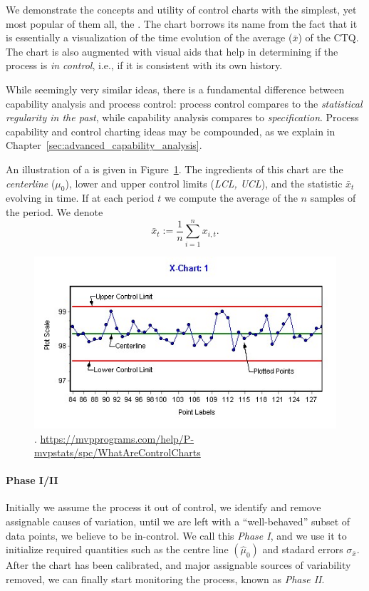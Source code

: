 We demonstrate the concepts and utility of control charts with the simplest, yet most popular of them all, the \barxChart. 
The chart borrows its name from the fact that it is essentially a visualization of the time evolution of the average ($\bar{x}$) of the CTQ. 
The chart is also augmented with visual aids that help in determining if the process is \emph{in control}, i.e., if it is consistent with its own history. 

\begin{remark}
While seemingly very similar ideas, there is a fundamental difference between capability analysis and process control:  process control compares to the \emph{statistical regularity in the past}, while capability analysis compares to \emph{specification}.
Process capability and control charting ideas may be compounded, as we explain in Chapter~\ref{sec:advanced_capability_analysis}.
\end{remark}


An illustration of a \barxChart is given in Figure~\ref{fig:bar_x_chart}. 
The ingredients of this chart are the \emph{centerline} ($\mu_0$), lower and upper control limits (\emph{LCL, UCL}), and the statistic $\bar{x}_t$ evolving in time. 
If at each period $t$ we compute the average of the $n$ samples of the period. We denote $$\bar{x}_t:=\frac 1n \sum_{i=1}^n x_{i,t}.$$

\begin{figure}[ht]
\centering
\includegraphics[height=0.3\textheight]{art/X-chartExample}
\caption[\barxChart]{\barxChart. \newline \url{https://mvpprograms.com/help/P-mvpstats/spc/WhatAreControlCharts}}
\label{fig:bar_x_chart}
\end{figure}

\paragraph{Phase I/II} 
Initially we assume the process it out of control, we identify and remove assignable causes of variation, until we are left with a ``well-behaved'' subset of data points, we believe to be in-control. 
We call this \emph{Phase I}, and we use it to initialize required quantities such as the centre line $(\hat{\mu}_0)$ and stadard errors $\sigma_{\bar{x}}$. 
After the chart has been calibrated, and major assignable sources of variability removed, we can finally start monitoring the process, known as \emph{Phase II}.


